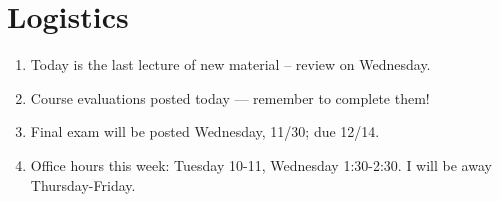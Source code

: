 \section*{Logistics}

\begin{enumerate}
\item Today is the last lecture of new material -- review on Wednesday.
\item Course evaluations posted today --- remember to complete them!
\item Final exam will be posted Wednesday, 11/30; due 12/14.
\item Office hours this week: Tuesday 10-11, Wednesday 1:30-2:30.
  I will be away Thursday-Friday.
\end{enumerate}
